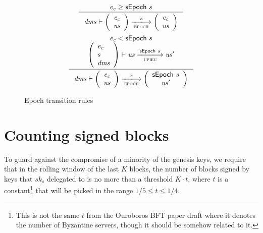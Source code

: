 \documentclass[11pt,a4paper]{article}
\newcommand{\var}[1]{\mathit{#1}}
\newcommand{\type}[1]{\mathsf{#1}}
\newcommand{\trans}[2]{\xlongrightarrow[\textsc{#1}]{#2}}
\begin{document}
\begin{figure}[ht]
  \begin{equation*}
    \inference
    {
      \var{e_c} \geq \sepoch{s}
    }
    {\var{dms} \vdash
      {
        \left(
          {\begin{array}{c}
             \var{e_c} \\
             \var{us}
           \end{array}
         }
       \right)
     }
     \trans{epoch}{s}
     {
       \left(
         {\begin{array}{c}
            \var{e_c} \\
            \var{us}
          \end{array}
        }
      \right)
    }
  }
\end{equation*}
\vspace{20pt}
\begin{equation*}
  \inference
  {
    \var{e_c} < \sepoch{s}
    \\
    {\left(
        \begin{array}{l}
          \var{\var{e_c}} \\
          \var{s} \\
          \var{dms}
        \end{array}
      \right)
    }
    \vdash \var{us} \trans{upiec}{\sepoch{s}} \var{us'}
  }
  {
    \var{dms} \vdash
    {
      \left(
        {\begin{array}{c}
           \var{e_c} \\
           \var{us}
         \end{array}
       }
     \right)
   }
   \trans{epoch}{\var{s}}
   {
     \left(
       {\begin{array}{c}
          \sepoch{s} \\
          \var{us'}
        \end{array}
      }
    \right)
  }
}
\end{equation*}
\caption{Epoch transition rules}
\label{fig:rules:epoch}
\end{figure}

\clearpage
\section{Counting signed blocks}

\newcommand{\BSCEnv}{\type{BSCEnv}}
\newcommand{\BSCState}{\type{BSCState}}

To guard against the compromise of a minority of the genesis keys,
we require that in the rolling window of the last $K$ blocks, the number of
blocks signed by keys that $sk_s$ delegated to is no more than a threshold $K
\cdot t$, where $t$ is a constant\footnote{This is not the same $t$ from the
  Ouroboros BFT paper draft where it denotes the number of Byzantine servers,
  though it should be somehow related to it.} that will be picked in the range
$1/5 \leq t \leq 1/4$.
\end{document}
